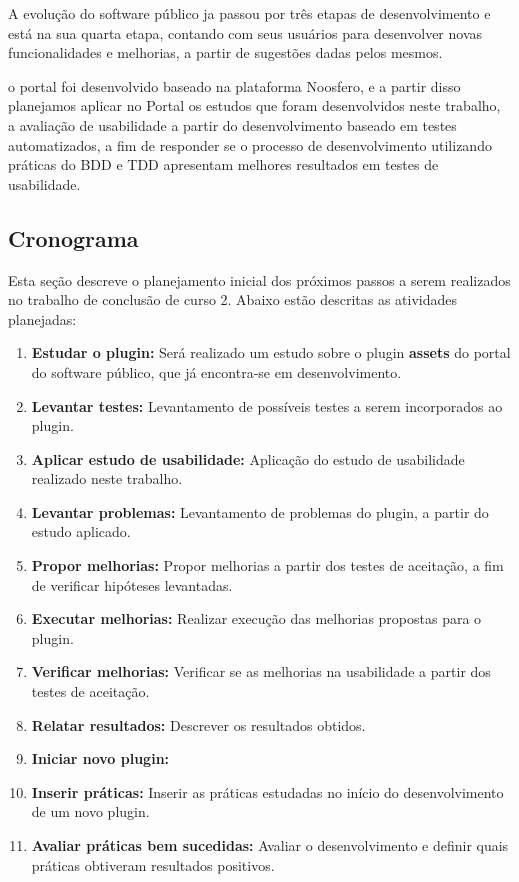 A evolução do software público ja passou por três etapas de desenvolvimento e está na sua quarta etapa, contando com seus usuários para desenvolver novas funcionalidades e melhorias, a partir de sugestões dadas pelos mesmos.

o portal foi desenvolvido baseado na plataforma Noosfero, e a partir disso planejamos aplicar no Portal os estudos que foram desenvolvidos neste trabalho, a avaliação de usabilidade a partir do desenvolvimento baseado em testes automatizados, a fim de responder se o processo de desenvolvimento utilizando práticas do BDD e TDD apresentam melhores resultados em testes de usabilidade.

\subsection{Cronograma}

Esta seção descreve o planejamento inicial dos próximos passos a serem realizados no trabalho de conclusão de curso 2. Abaixo estão descritas as atividades planejadas:

\begin{enumerate}
\item \textbf{Estudar o plugin:} Será realizado um estudo sobre o plugin \textbf{assets} do portal do software público, que já encontra-se em desenvolvimento.
\item \textbf{Levantar testes:} Levantamento de possíveis testes a serem incorporados ao plugin.
\item \textbf{Aplicar estudo de usabilidade:} Aplicação do estudo de usabilidade realizado neste trabalho.
\item \textbf{Levantar problemas:} Levantamento de problemas do plugin, a partir do estudo aplicado.
\item  \textbf{Propor melhorias:} Propor melhorias a partir dos testes de aceitação, a fim de verificar hipóteses levantadas.
\item \textbf{Executar melhorias:} Realizar execução das melhorias propostas para o plugin.
\item \textbf{Verificar melhorias:} Verificar se as melhorias na usabilidade a partir dos testes de aceitação.
\item \textbf{Relatar resultados:} Descrever os resultados obtidos.
\item \textbf{Iniciar novo plugin:} 
\item \textbf{Inserir práticas:} Inserir as práticas estudadas no início do desenvolvimento de um novo plugin.
\item \textbf{Avaliar práticas bem sucedidas:} Avaliar o desenvolvimento e definir quais práticas obtiveram resultados positivos.

\end{enumerate}

